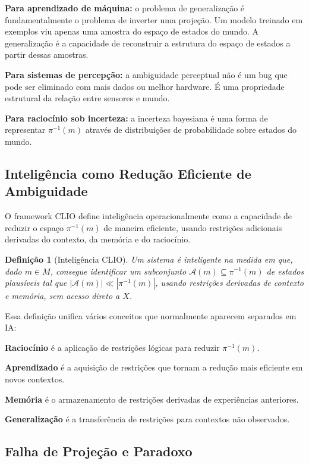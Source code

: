 \documentclass[11pt, a4paper]{article}
\theoremstyle{named}
\newtheorem{definicao}{Definição}
\begin{document}
\textbf{Para aprendizado de máquina:} o problema de generalização é
fundamentalmente o problema de inverter uma projeção. Um modelo treinado
em exemplos viu apenas uma amostra do espaço de estados do mundo. A
generalização é a capacidade de reconstruir a estrutura do espaço de
estados a partir dessas amostras.

\textbf{Para sistemas de percepção:} a ambiguidade perceptual não é
um bug que pode ser eliminado com mais dados ou melhor hardware. É uma
propriedade estrutural da relação entre sensores e mundo.

\textbf{Para raciocínio sob incerteza:} a incerteza bayesiana é uma
forma de representar $\pi^{-1}(m)$ através de distribuições de
probabilidade sobre estados do mundo.

\subsection{Inteligência como Redução Eficiente de Ambiguidade}

O framework CLIO define inteligência operacionalmente como a capacidade
de reduzir o espaço $\pi^{-1}(m)$ de maneira eficiente, usando
restrições adicionais derivadas do contexto, da memória e do raciocínio.

\begin{definicao}[Inteligência CLIO]
Um sistema é inteligente na medida em que, dado $m \in M$, consegue
identificar um subconjunto $\mathcal{A}(m) \subseteq \pi^{-1}(m)$
de estados plausíveis tal que $|\mathcal{A}(m)| \ll |\pi^{-1}(m)|$,
usando restrições derivadas de contexto e memória, sem acesso direto
a $X$.
\end{definicao}

Essa definição unifica vários conceitos que normalmente aparecem
separados em IA:

\textbf{Raciocínio} é a aplicação de restrições lógicas para reduzir
$\pi^{-1}(m)$.

\textbf{Aprendizado} é a aquisição de restrições que tornam a redução
mais eficiente em novos contextos.

\textbf{Memória} é o armazenamento de restrições derivadas de
experiências anteriores.

\textbf{Generalização} é a transferência de restrições para contextos
não observados.

\subsection{Falha de Projeção e Paradoxo}
\end{document}
